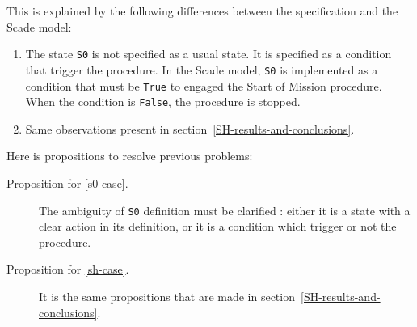 This is explained by the following differences between the
specification and the Scade model:
\begin{enumerate}
\item \label{s0-case} The state \texttt{S0} is not specified as a
  usual state. It is specified as a condition that trigger the
  procedure. In the Scade model, \texttt{S0} is implemented as a
  condition that must be \texttt{True} to engaged the Start of Mission
  procedure. When the condition is \texttt{False}, the procedure is
  stopped.

\item \label{sh-case} Same observations present in
  section~\ref{SH-results-and-conclusions}.
\end{enumerate}


Here is propositions to resolve previous problems:
\begin{description}
\item[Proposition for \ref{s0-case}.] The ambiguity of \texttt{S0} definition must be
  clarified : either it is a state with a clear action in its
  definition, or it is a condition which trigger or not the procedure.
\item[Proposition for \ref{sh-case}.] It is the same propositions that
  are made in section~\ref{SH-results-and-conclusions}.
\end{description}
